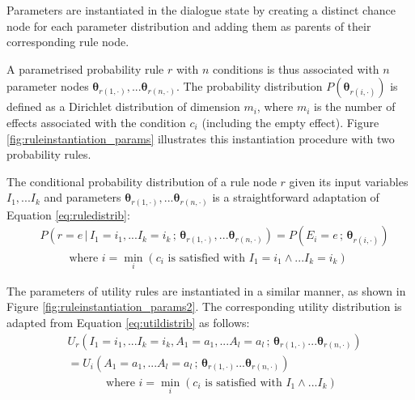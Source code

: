 Parameters are instantiated in the dialogue state by creating a distinct chance node for each parameter distribution and adding them as parents of their corresponding rule node.  

A parametrised probability rule $r$ with $n$ conditions is thus associated with $n$ parameter nodes $\boldsymbol\theta_{r(1, \cdot)}, ... \boldsymbol\theta_{r(n, \cdot)}$.  The probability distribution $P(\boldsymbol\theta_{r(i, \cdot)})$ is defined as a Dirichlet distribution of dimension $m_i$, where $m_i$ is the number of effects associated with the condition $c_i$ (including the empty effect). Figure \ref{fig:ruleinstantiation_params} illustrates this instantiation procedure with two probability rules.  

The conditional probability distribution of a rule node $r$ given its input variables $I_1,...I_k$ and parameters $\boldsymbol\theta_{r(1, \cdot)}, ... \boldsymbol\theta_{r(n, \cdot)}$ is a straightforward adaptation of Equation \eqref{eq:ruledistrib}:
\begin{align}
& P(r\!=\!e \, | \, I_1\!=\!i_1,... I_k\!=\!i_k \, ; \, \boldsymbol\theta_{r(1, \cdot)}, ... \boldsymbol\theta_{r(n, \cdot)})  = P(E_i = e \, ; \, \boldsymbol\theta_{r(i, \cdot)}) \\
& \; \; \; \; \; \; \; \; \text{ where } i = \min_i (c_i \text{ is satisfied with } I_1\!=\!i_1 \land ... I_k\!=\!i_k) \nonumber
\end{align}

The parameters of utility rules are instantiated in a similar manner, as shown in Figure \ref{fig:ruleinstantiation_params2}. The corresponding utility distribution is adapted from Equation \ref{eq:utildistrib} as follows:
\begin{align}
& U_r(I_1\!=\!i_1,... I_k\!=\!i_k, A_1\!=\!a_1,... A_l\!=\!a_l \, ; \, \boldsymbol\theta_{r(1, \cdot)} ... \boldsymbol\theta_{r(n, \cdot)}) \nonumber \\
& = U_i(A_1\!=\!a_1,... A_l\!=\!a_l \, ; \, \boldsymbol\theta_{r(1, \cdot)} ... \boldsymbol\theta_{r(n, \cdot)})  \label{eq:utildistrib}\\
&  \; \; \; \; \; \; \; \;  \; \; \; \text{ where } i = \min_i (c_i \text{ is satisfied with } I_1 \land ... I_k) \nonumber
\end{align}

